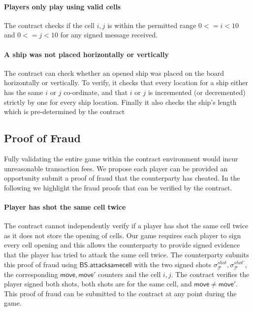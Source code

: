 \documentclass{llncs}
\newcommand{\participant}{\mathcal{P}}
\newcommand{\battleshipsamecell}{\mathsf{BS.attacksamecell}}
\begin{document}
\paragraph{Players only play using valid cells}  
The contract checks if the cell $i,j$ is within the permitted range $0 <= i < 10$ and $0 <= j < 10$ for any signed message received. 

\paragraph{A ship was not placed  horizontally or vertically}
The contract can check whether an opened ship was placed on the board horizontally or vertically. 
To verify, it checks that every location for a ship either has the same $i$ or $j$ co-ordinate, and that $i$ or $j$ is incremented (or decremented) strictly by one for every ship location. 
Finally it also checks the ship's length which is pre-determined by the contract

\subsection{Proof of Fraud}  \label{sec:prooffraud}

Fully validating the entire game within the contract environment would incur unreasonable transaction fees. 
We propose each player can be provided an opportunity submit a proof of fraud that the counterparty has cheated. 
In the following we highlight the fraud proofs that can be verified by the contract. 

\paragraph{Player has shot the same cell twice} 
The contract cannot independently verify if a player has shot the same cell twice as it does not store the opening of cells.
Our game requires each player to sign every cell opening and this allows the counterparty to provide signed evidence that the player has tried to attack the same cell twice.
The counterparty submits this proof of fraud using $\battleshipsamecell$ with the two signed shots $\sigma^{shot}_{\participant},\sigma^{shot'}_{\participant}$, the corresponding $\mathsf{move},\mathsf{move}'$ counters and the cell $i,j$. 
The contract verifies the player signed both shots, both shots are for the same cell, and $\mathsf{move}\neq\mathsf{move}'$. 
This proof of fraud can be submitted to the contract at any point during the game. 
\end{document}
